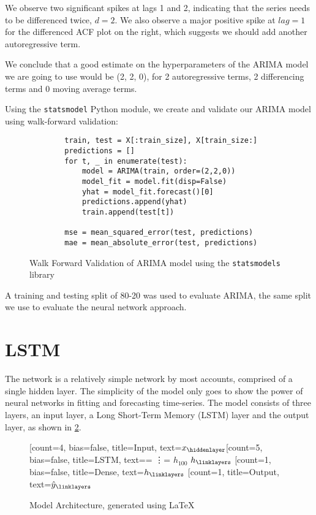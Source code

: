We observe two significant spikes at lags 1 and 2, indicating that the series needs to be differenced twice, $d = 2$. We also observe a major positive spike at $lag=1$ for the differenced ACF plot on the right, which suggests we should add another autoregressive term.

We conclude that a good estimate on the hyperparameters of the ARIMA model we are going to use would be (2, 2, 0), for 2 autoregressive terms, 2 differencing terms and 0 moving average terms.

Using the \texttt{statsmodel} Python module, we create and validate our ARIMA model using walk-forward validation:

\begin{figure}[H]
    \begin{verbatim}
        train, test = X[:train_size], X[train_size:]
        predictions = []
        for t, _ in enumerate(test):
            model = ARIMA(train, order=(2,2,0))
            model_fit = model.fit(disp=False)
            yhat = model_fit.forecast()[0]
            predictions.append(yhat)
            train.append(test[t])

        mse = mean_squared_error(test, predictions)
        mae = mean_absolute_error(test, predictions)
    \end{verbatim}
    \caption{Walk Forward Validation of ARIMA model using the \texttt{statsmodels} library}
    \label{code:arima}
\end{figure}

A training and testing split of 80-20 was used to evaluate ARIMA, the same split we use to evaluate the neural network approach.

\section{LSTM}
The network is a relatively simple network by most accounts, comprised of a single hidden layer. The simplicity of the model only goes to show the power of neural networks in fitting and forecasting time-series. The model consists of three layers, an input layer, a Long Short-Term Memory (LSTM) layer and the output layer, as shown in \ref{tab:model_arch}.

\begin{figure}[H]
    \centering
    \begin{neuralnetwork}[height=4]
        \newcommand{\x}[2]{$x_#2$}
        \newcommand{\y}[2]{$\hat{y}_#2$}
        \newcommand{\h}[2]{$h_#2$}
        \newcommand{\hlast}[2]{\ifnum4=#2 \vdots \else \ifnum5=#2 $h_{100}$ \else $h_#2$ \fi \fi}
        [count=4, bias=false, title=Input, text=\x]
        \hiddenlayer[count=5, bias=false, title=LSTM, text=\hlast] 
        \linklayers
        \hiddenlayer[count=1, bias=false, title=Dense, text=\h]
        \linklayers
        \outputlayer[count=1, title=Output, text=\y] 
        \linklayers
    \end{neuralnetwork}
    \caption{Model Architecture, generated using \LaTeX}
    \label{tab:model_arch}
\end{figure}

